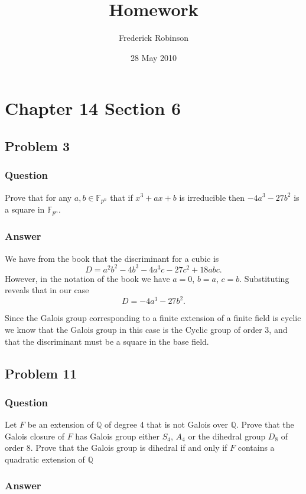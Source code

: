 \documentclass[10pt]{article}
\title{Homework}
\author{Frederick Robinson}
\date{28 May 2010}
\begin{document}

   \maketitle

\setcounter{tocdepth}{2} 


\section{Chapter 14 Section 6}
\subsection{Problem 3}
\subsubsection{Question}
Prove that for any $a, b \in \mathbb{F}_{p^n}$ that if $x^3+ax+b$ is irreducible then $-4a^3-27b^2$ is a square in $\mathbb{F}_{p^n}$.
\subsubsection{Answer}
We have from the book that the discriminant for a cubic is
\[D = a^2 b^2 -4b^3-4a^3 c-27c^2 + 18 abc.\]
However, in the notation of the book we have $a=0$, $b=a$, $c=b$. Substituting reveals that in our case
\[D = -4a^3 -27 b^2.\]

Since the Galois group corresponding to a finite extension of a finite field is cyclic we know that the Galois group in this case is the Cyclic group of order 3, and that the discriminant must be a square in the base field.

\subsection{Problem 11}
\subsubsection{Question}
Let $F$ be an extension of $\mathbb{Q}$ of degree 4 that is not Galois over $\mathbb{Q}$. Prove that the Galois closure of $F$ has Galois group either $S_4$, $A_4$ or the dihedral group $D_8$ of order 8. Prove that the Galois group is dihedral if and only if $F$ contains a quadratic extension of $\mathbb{Q}$
\subsubsection{Answer}
\end{document}
